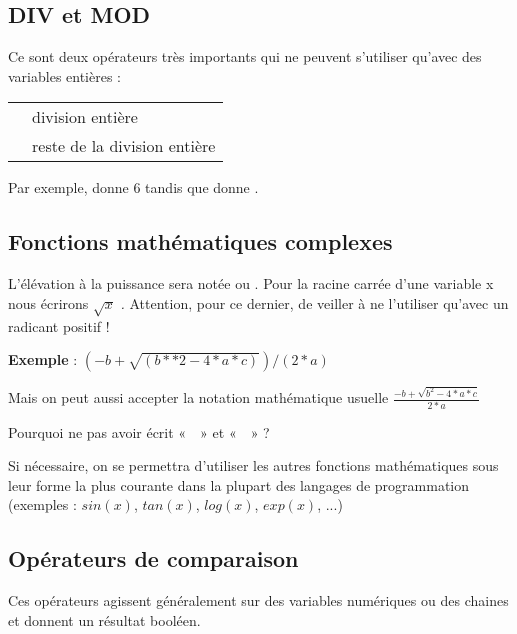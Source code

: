 		\subsection{DIV et MOD}
	
			Ce sont deux opérateurs très importants qui ne peuvent s’utiliser
			qu’avec des variables entières :
	
			\begin{center}
			\tablehead{}
			\begin{supertabular}{m{1cm}|m{12cm}}
			\raggedleft  {} & division entière\\
			\raggedleft  {} & reste de la division entière\\
			\end{supertabular}
			\end{center}
	
			Par exemple,  donne 6 tandis que
			 donne .
	
		\subsection{Fonctions mathématiques complexes}
	
			L’élévation à la puissance sera notée \textstyleCodeInsr{**} ou
			\textstyleCodeInsr{\^{}} . Pour la racine carrée d’une variable x nous
			écrirons  $\sqrt{x}$ \textit{.} Attention, pour ce dernier, de veiller
			à ne l’utiliser qu’avec un radicant positif !
	
			\textbf{Exemple} : 
			$(-b+\sqrt{(b\ast \ast 2-4\ast a\ast c)})/(2\ast a)$
			
			Mais on peut aussi accepter la notation mathématique usuelle
			$\frac{-b+\sqrt{b^{2}-4\ast a\ast c}}{2\ast a}$ 
	
			Pourquoi ne pas avoir écrit «~~» et
			«~~» ?
	
			Si nécessaire, on se permettra d'utiliser les autres
			fonctions mathématiques sous leur forme la plus courante dans la
			plupart des langages de programmation (exemples :
			$sin(x)$, $tan(x)$, $log(x)$, $exp(x)$, ...)
			
		
		\subsection{Opérateurs de comparaison}
	
			Ces opérateurs agissent généralement sur des variables numériques ou des
			chaines et donnent un résultat booléen.
	
